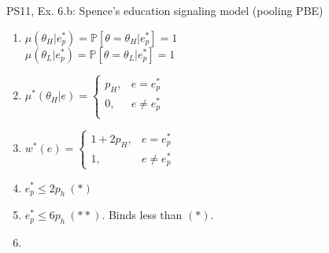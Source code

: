 \begin{frame}{PS11, Ex. 6.b: Spence’s education signaling model (pooling PBE)}
\begin{multicols}{2}
\begin{enumerate}
        \item \vspace{-2pt}$\mu\left(\theta_H|e_p^*\right)=
               \mathbb{P}\left[\theta=\theta_H|e_p^*\right]=1$\\
              $\mu\left(\theta_L|e_p^*\right)=
               \mathbb{P}\left[\theta=\theta_L|e_p^*\right]=1$
        \item \vspace{-2pt}$\mu^*(\theta_H|e)=\left\{\begin{array}{ll}
                  p_H, & e = e_p^* \\
                  0, & e \neq e_p^* \\
               \end{array}\right.$
        \item \vspace{-2pt}$w^*(e)=\left\{\begin{array}{ll}
                  1+2p_H, & e = e_p^* \\
                  1, & e \neq e_p^*
               \end{array}\right.$
        \item \vspace{-2pt}$e_p^*\leq2p_h\ (*)$
        \item \vspace{-2pt}$e_p^*\leq6p_h\ (**)$. Binds less than $(*)$.
        \item[] {}
      \end{enumerate}
    \end{multicols}
    \vfill\null
\end{frame}
